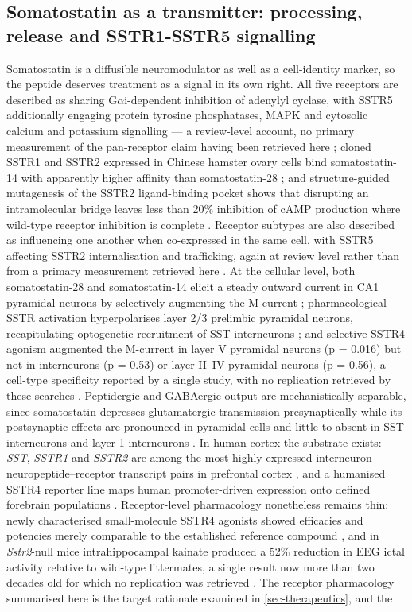 \documentclass[11pt]{article}
\begin{document}
\subsection{Somatostatin as a transmitter: processing, release and SSTR1-SSTR5 signalling}
\label{sec-02-peptide}

Somatostatin is a diffusible neuromodulator as well as a cell-identity marker, so the peptide deserves treatment as a signal in its own right. All five receptors are described as sharing G$\alpha$i-dependent inhibition of adenylyl cyclase, with SSTR5 additionally engaging protein tyrosine phosphatases, MAPK and cytosolic calcium and potassium signalling --- a review-level account, no primary measurement of the pan-receptor claim having been retrieved here \citep{Gunther2018}; cloned SSTR1 and SSTR2 expressed in Chinese hamster ovary cells bind somatostatin-14 with apparently higher affinity than somatostatin-28 \citep{Yamada1992}; and structure-guided mutagenesis of the SSTR2 ligand-binding pocket shows that disrupting an intramolecular bridge leaves less than 20\% inhibition of cAMP production where wild-type receptor inhibition is complete \citep{Heo2022}. Receptor subtypes are also described as influencing one another when co-expressed in the same cell, with SSTR5 affecting SSTR2 internalisation and trafficking, again at review level rather than from a primary measurement retrieved here \citep{Lin2013}. At the cellular level, both somatostatin-28 and somatostatin-14 elicit a steady outward current in CA1 pyramidal neurons by selectively augmenting the M-current \citep{Moore1988}; pharmacological SSTR activation hyperpolarises layer 2/3 prelimbic pyramidal neurons, recapitulating optogenetic recruitment of SST interneurons \citep{Brockway2023}; and selective SSTR4 agonism augmented the M-current in layer V pyramidal neurons (p = 0.016) but not in interneurons (p = 0.53) or layer II--IV pyramidal neurons (p = 0.56), a cell-type specificity reported by a single study, with no replication retrieved by these searches \citep{Kecskes2020}. Peptidergic and GABAergic output are mechanistically separable, since somatostatin depresses glutamatergic transmission presynaptically while its postsynaptic effects are pronounced in pyramidal cells and little to absent in SST interneurons and layer 1 interneurons \citep{Riedemann2024}. In human cortex the substrate exists: \emph{SST}, \emph{SSTR1} and \emph{SSTR2} are among the most highly expressed interneuron neuropeptide--receptor transcript pairs in prefrontal cortex \citep{Zhong2022}, and a humanised SSTR4 reporter line maps human promoter-driven expression onto defined forebrain populations \citep{Nemes2021}. Receptor-level pharmacology nonetheless remains thin: newly characterised small-molecule SSTR4 agonists showed efficacies and potencies merely comparable to the established reference compound \citep{Biskup2026}, and in \emph{Sstr2}-null mice intrahippocampal kainate produced a 52\% reduction in EEG ictal activity relative to wild-type littermates, a single result now more than two decades old for which no replication was retrieved \citep{Moneta2002}. The receptor pharmacology summarised here is the target rationale examined in \ref{sec-therapeutics}, and the 
\end{document}
